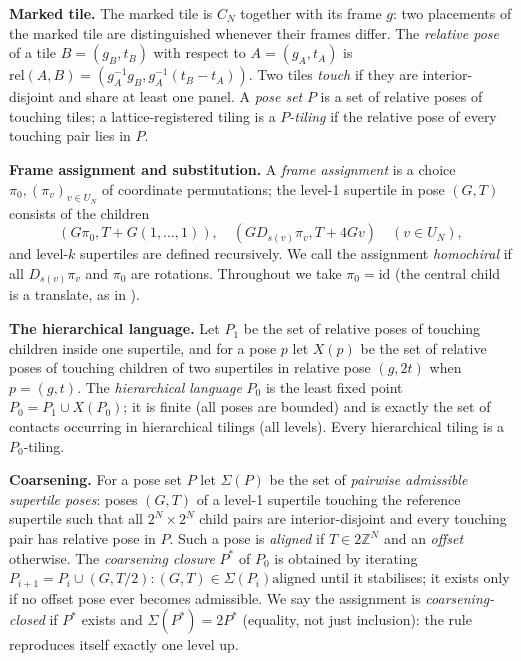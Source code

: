\documentclass[11pt,a4paper]{article}
\theoremstyle{plain}
\theoremstyle{definition}
\begin{document}
\textbf{Marked tile.} The marked tile is $C_N$ together with its frame $g$: two placements of the marked tile are distinguished whenever their frames differ. The \emph{relative pose} of a tile $B = (g_B, t_B)$ with respect to $A = (g_A, t_A)$ is $\mathrm{rel}(A,B) = (g_A^{-1} g_B, g_A^{-1}(t_B - t_A))$. Two tiles \emph{touch} if they are interior-disjoint and share at least one panel. A \emph{pose set} $P$ is a set of relative poses of touching tiles; a lattice-registered tiling is a \emph{$P$-tiling} if the relative pose of every touching pair lies in $P$.

\textbf{Frame assignment and substitution.} A \emph{frame assignment} is a choice $\pi_0, (\pi_v)_{v \in U_N}$ of coordinate permutations; the level-1 supertile in pose $(G, T)$ consists of the children
\[(G \pi_0, T + G(1,\dots,1)), \quad (G D_{s(v)} \pi_v, T + 4 G v) \quad (v \in U_N),\]
and level-$k$ supertiles are defined recursively. We call the assignment \emph{homochiral} if all $D_{s(v)} \pi_v$ and $\pi_0$ are rotations. Throughout we take $\pi_0 = \mathrm{\mathrm{id}}$ (the central child is a translate, as in \cite{gs2026}).

\textbf{The hierarchical language.} Let $P_1$ be the set of relative poses of touching children inside one supertile, and for a pose $p$ let $X(p)$ be the set of relative poses of touching children of two supertiles in relative pose $(g, 2t)$ when $p = (g,t)$. The \emph{hierarchical language} $P_0$ is the least fixed point $P_0 = P_1 \cup X(P_0)$; it is finite (all poses are bounded) and is exactly the set of contacts occurring in hierarchical tilings (all levels). Every hierarchical tiling is a $P_0$-tiling.

\textbf{Coarsening.} For a pose set $P$ let $\Sigma(P)$ be the set of \emph{pairwise admissible supertile poses}: poses $(G,T)$ of a level-1 supertile touching the reference supertile such that all $2^N \times 2^N$ child pairs are interior-disjoint and every touching pair has relative pose in $P$. Such a pose is \emph{aligned} if $T \in 2 \mathbb{Z}^N$ and an \emph{offset} otherwise. The \emph{coarsening closure} $P^*$ of $P_0$ is obtained by iterating $P_{i+1} = P_i \cup {(G, T/2) : (G,T) \in \Sigma(P_i) \mathrm{aligned}}$ until it stabilises; it exists only if no offset pose ever becomes admissible. We say the assignment is \emph{coarsening-closed} if $P^*$ exists and $\Sigma(P^*) = 2P^*$ (equality, not just inclusion): the rule reproduces itself exactly one level up.
\end{document}
